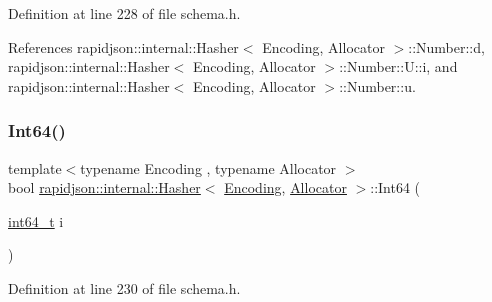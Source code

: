 Definition at line 228 of file schema.\+h.


\begin{DoxyCode}{0}

\end{DoxyCode}


References rapidjson\+::internal\+::\+Hasher$<$ Encoding, Allocator $>$\+::\+Number\+::d, rapidjson\+::internal\+::\+Hasher$<$ Encoding, Allocator $>$\+::\+Number\+::\+U\+::i, and rapidjson\+::internal\+::\+Hasher$<$ Encoding, Allocator $>$\+::\+Number\+::u.

\mbox{\label{classrapidjson_1_1internal_1_1_hasher_a59633b0064bcd54aac31b8459c78cd34}} 
\subsubsection{\texorpdfstring{Int64()}{Int64()}}
{\footnotesize\ttfamily template$<$typename Encoding , typename Allocator $>$ \\
bool \mbox{\hyperlink{classrapidjson_1_1internal_1_1_hasher}{rapidjson\+::internal\+::\+Hasher}}$<$ \mbox{\hyperlink{classrapidjson_1_1_encoding}{Encoding}}, \mbox{\hyperlink{classrapidjson_1_1_allocator}{Allocator}} $>$\+::Int64 (\begin{DoxyParamCaption}\item[{\mbox{\hyperlink{stdint_8h_a414156feea104f8f75b4ed9e3121b2f6}{int64\+\_\+t}}}]{i }\end{DoxyParamCaption})}



Definition at line 230 of file schema.\+h.


\begin{DoxyCode}{0}

\end{DoxyCode}


